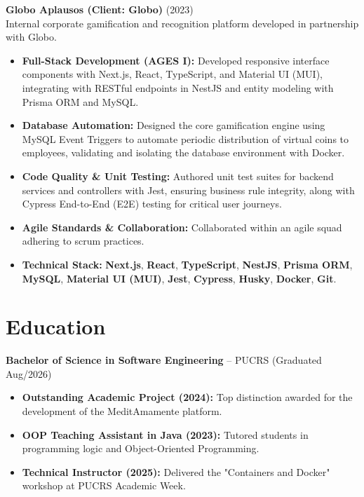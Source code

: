 \documentclass[10pt, letterpaper]{article}
\newenvironment{highlights}{
    \begin{itemize}[
        topsep=0.10 cm,
        parsep=0.10 cm,
        partopsep=0pt,
        itemsep=0pt,
        leftmargin=0 cm + 10pt
    ]
}{
    \end{itemize}
}
\begin{document}
\textbf{Globo Aplausos (Client: Globo\texttrademark)} \hfill (2023) \\
Internal corporate gamification and recognition platform developed in partnership with Globo.
\begin{itemize}
    \item \textbf{Full-Stack Development (AGES I):} Developed responsive interface components with Next.js, React, TypeScript, and Material UI (MUI), integrating with RESTful endpoints in NestJS and entity modeling with Prisma ORM and MySQL.

    \item \textbf{Database Automation:} Designed the core gamification engine using MySQL Event Triggers to automate periodic distribution of virtual coins to employees, validating and isolating the database environment with Docker.

    \item \textbf{Code Quality \& Unit Testing:} Authored unit test suites for backend services and controllers with Jest, ensuring business rule integrity, along with Cypress End-to-End (E2E) testing for critical user journeys.

    \item \textbf{Agile Standards \& Collaboration:} Collaborated within an agile squad adhering to scrum practices.

    \item \textbf{Technical Stack:} \textbf{Next.js}, \textbf{React}, \textbf{TypeScript}, \textbf{NestJS}, \textbf{Prisma ORM}, \textbf{MySQL}, \textbf{Material UI (MUI)}, \textbf{Jest}, \textbf{Cypress}, \textbf{Husky}, \textbf{Docker}, \textbf{Git}.
\end{itemize}

\section*{Education}
\textbf{Bachelor of Science in Software Engineering} -- PUCRS \hfill (Graduated Aug/2026)
\begin{highlights}
    \item \textbf{Outstanding Academic Project (2024):} Top distinction awarded for the development of the MeditAmamente platform.
    \item \textbf{OOP Teaching Assistant in Java (2023):} Tutored students in programming logic and Object-Oriented Programming.
    \item \textbf{Technical Instructor (2025):} Delivered the "Containers and Docker" workshop at PUCRS Academic Week.
\end{highlights}
\end{document}
